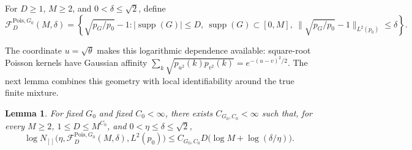 \documentclass[11pt]{article}
\newtheorem{lemma}[theorem]{Lemma}
\theoremstyle{definition}
\numberwithin{equation}{section}
\DeclareMathOperator{\supp}{supp}
\begin{document}
For \(D\ge1\), \(M\ge2\), and \(0<\delta\le\sqrt2\), define
\[
    \mathcal F_D^{\mathrm{Pois},G_0}(M,\delta)
    =
    \left\{
        \sqrt{p_G/p_0}-1:
        |\supp(G)|\le D,
        \ \supp(G)\subset[0,M],
        \ \|\sqrt{p_G/p_0}-1\|_{L^2(p_0)}\le\delta
    \right\}.
\]

The coordinate \(u=\sqrt\theta\) makes this logarithmic dependence
available: square-root Poisson kernels have Gaussian affinity
\(\sum_k\sqrt{p_{u^2}(k)p_{v^2}(k)}=e^{-(u-v)^2/2}\). The next lemma
combines this geometry with local identifiability around the true finite
mixture.

\begin{lemma}
\label{lem:poisson-finite-local}
For fixed \(G_0\) and fixed \(C_0<\infty\), there exists
\(C_{G_0,C_0}<\infty\) such that, for every \(M\ge2\),
\(1\le D\le M^{C_0}\), and \(0<\eta\le\delta\le\sqrt2\),
\[
    \log N_{[]}
    \bigl(
        \eta,
        \mathcal F_D^{\mathrm{Pois},G_0}(M,\delta),
        L^2(p_0)
    \bigr)
    \le
        C_{G_0,C_0}D\bigl(\log M+\log(\delta/\eta)\bigr).
\]
\end{lemma}
\end{document}

